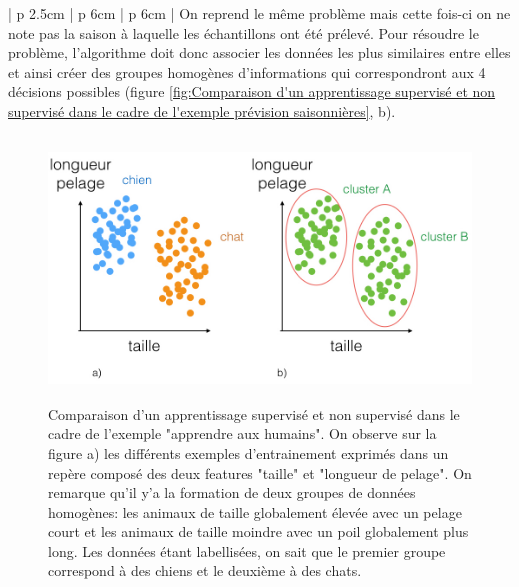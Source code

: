\begin{table}[h]
\begin{tabular}{ | p {2.5cm} | p {6cm} | p {6cm} |}
	On reprend le même problème mais cette fois-ci on ne note pas la saison à laquelle les échantillons ont été prélevé. Pour résoudre le problème, l'algorithme doit donc associer les données les plus similaires entre elles et ainsi créer des groupes homogènes d'informations qui correspondront aux 4 décisions possibles (figure \ref{fig:Comparaison d'un apprentissage supervisé et non supervisé dans le cadre de l'exemple prévision saisonnières}, b). \\
	\hline
	\end{tabular}
	\caption[Comparaison des différents modèles d'apprentissage]{Comparaison de l'apprentissage supervisé et non supervisé par des exemples}
	\label {tab: Comparaison des différentes méthodes d'apprentissage}
\end{table}

\begin{figure}[h]
	\centering\includegraphics[height=7cm]{images/apprentissage_chat.jpeg}
	\caption[Comparaison d'un apprentissage supervisé et non supervisé dans le cadre de l'exemple "apprendre aux humains"]{Comparaison d'un apprentissage supervisé et non supervisé dans le cadre de l'exemple "apprendre aux humains". On observe sur la figure a) les différents exemples d'entrainement exprimés dans un repère composé des deux features "taille" et "longueur de pelage". On remarque qu'il y'a la formation de deux groupes de données homogènes: les animaux de taille globalement élevée avec un pelage court et les animaux de taille moindre avec un poil globalement plus long. Les données étant labellisées, on sait que le premier groupe correspond à des chiens et le deuxième à des chats.}
	\label{fig:Comparaison d'un apprentissage supervisé et non supervisé dans le cadre de l'exemple "apprendre aux humains"}
\end{figure}

